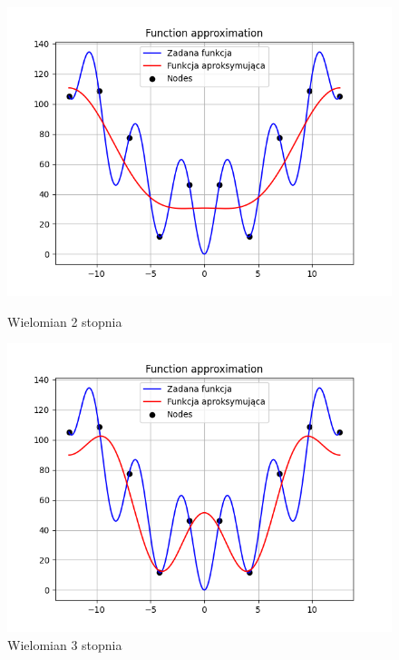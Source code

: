 \documentclass{article}
\begin{document}
\begin{figure}[H]
  \begin{minipage}[b]{0.49\textwidth}
    \begin{minipage}[b]{\textwidth}
      \includegraphics[width=\textwidth]{img04.png}
      \caption{Wielomian 2 stopnia}
    \end{minipage}
    \vspace*{\fill}
    \begin{minipage}[b]{\textwidth}
      \includegraphics[width=\textwidth]{img05.png}
      \caption{Wielomian 3 stopnia}
    \end{minipage}
  \end{minipage}
  \hfill
  \begin{minipage}[b]{0.49\textwidth}

\end{minipage}
\end{figure}
\end{document}
